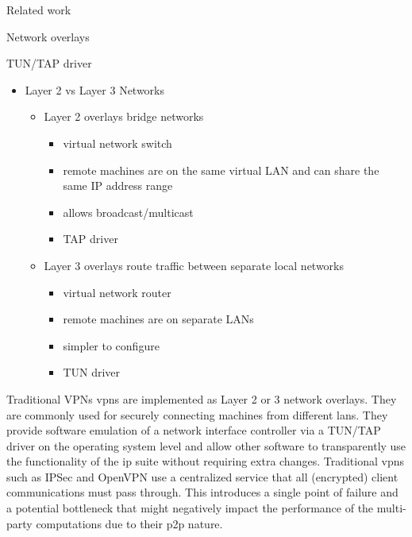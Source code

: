 \begin{frame}[fragile]{Related work}
\begin{block}{Network overlays}
\begin{block}{TUN/TAP driver}
\protect\hypertarget{thesis__020-related-work.md__tuntap-driver}{}
\begin{itemize}
\tightlist
\item
  Layer 2 vs Layer 3 Networks

  \begin{itemize}
  \tightlist
  \item
    Layer 2 overlays bridge networks

    \begin{itemize}
    \tightlist
    \item
      virtual network switch
    \item
      remote machines are on the same virtual LAN and can share the same
      IP address range
    \item
      allows broadcast/multicast
    \item
      TAP driver
    \end{itemize}
  \item
    Layer 3 overlays route traffic between separate local networks

    \begin{itemize}
    \tightlist
    \item
      virtual network router
    \item
      remote machines are on separate LANs
    \item
      simpler to configure
    \item
      TUN driver
    \end{itemize}
  \end{itemize}
\end{itemize}
\end{block}

\begin{block}{Traditional VPNs}
\protect\hypertarget{thesis__020-related-work.md__traditional-vpns}{}
\glspl{vpn} are implemented as Layer 2 or 3 network overlays. They are
commonly used for securely connecting machines from different
\glspl{lan}. They provide software emulation of a network interface
controller via a TUN/TAP driver on the operating system level and allow
other software to transparently use the functionality of the \gls{ip}
suite without requiring extra changes. Traditional \glspl{vpn} such as
IPSec \autocite{ipSecDocs} and OpenVPN \autocite{openVPNDocs} use a
centralized service that all (encrypted) client communications must pass
through. This introduces a single point of failure and a potential
bottleneck that might negatively impact the performance of the
multi-party computations due to their \gls{p2p} nature.
\end{block}


\end{block}
\end{frame}
